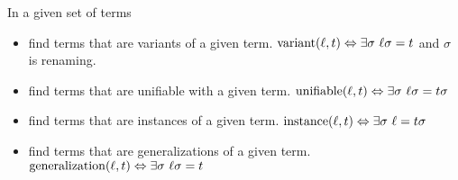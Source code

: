 
\begin{definition}
In a given set of terms
\begin{itemize}
\item find terms that are variants of a given term.
$\VRNT(\ell,t) \Leftrightarrow \exists\sigma\ \ell\sigma = t$ and $\sigma$ is renaming.
\item find terms that are  unifiable with a given term. 
$\UNIF(\ell,t) \Leftrightarrow \exists\sigma\ \ell\sigma = t\sigma$
\item find terms that are  instances of a given term.
$\operatorname{instance}(\ell,t) \Leftrightarrow \exists\sigma\ \ell = t\sigma$
\item find terms that are  generalizations of a given term.
$\GNRL(\ell,t) \Leftrightarrow \exists\sigma\ \ell\sigma = t$
\end{itemize}
\end{definition}